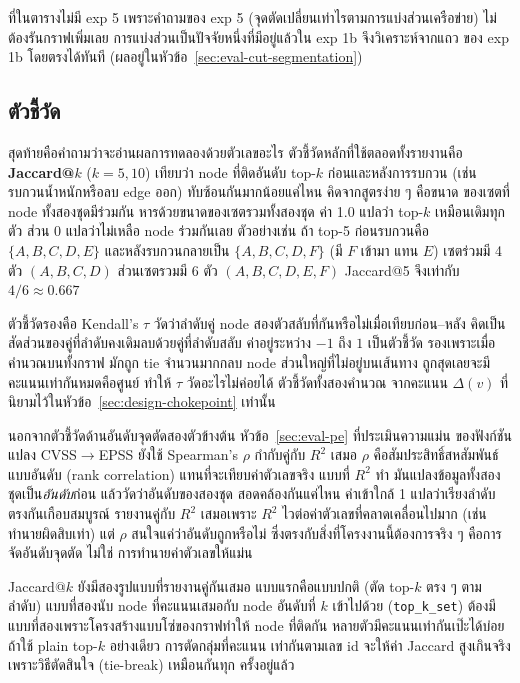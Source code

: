 ที่ในตารางไม่มี exp 5 เพราะคำถามของ exp 5 (จุดตัดเปลี่ยนเท่าไรตามการแบ่งส่วนเครือข่าย)
ไม่ต้องรันกราฟเพิ่มเลย การแบ่งส่วนเป็นปัจจัยหนึ่งที่มีอยู่แล้วใน exp 1b จึงวิเคราะห์จากแถว
ของ exp 1b โดยตรงได้ทันที (ผลอยู่ในหัวข้อ~\ref{sec:eval-cut-segmentation})

\subsection{ตัวชี้วัด}\label{sec:design-metrics}

สุดท้ายคือคำถามว่าจะอ่านผลการทดลองด้วยตัวเลขอะไร ตัวชี้วัดหลักที่ใช้ตลอดทั้งรายงานคือ
\textbf{Jaccard@$k$} ($k=5,10$) เทียบว่า node ที่ติดอันดับ top-$k$ ก่อนและหลังการรบกวน
(เช่น รบกวนน้ำหนักหรือลบ edge ออก) ทับซ้อนกันมากน้อยแค่ไหน คิดจากสูตรง่าย ๆ คือขนาด
ของเซตที่ node ทั้งสองชุดมีร่วมกัน หารด้วยขนาดของเซตรวมทั้งสองชุด ค่า 1.0 แปลว่า
top-$k$ เหมือนเดิมทุกตัว ส่วน 0 แปลว่าไม่เหลือ node ร่วมกันเลย ตัวอย่างเช่น ถ้า top-5
ก่อนรบกวนคือ $\{A,B,C,D,E\}$ และหลังรบกวนกลายเป็น $\{A,B,C,D,F\}$ (มี $F$ เข้ามา
แทน $E$) เซตร่วมมี 4 ตัว $(A,B,C,D)$ ส่วนเซตรวมมี 6 ตัว $(A,B,C,D,E,F)$ Jaccard@5
จึงเท่ากับ $4/6 \approx 0.667$

ตัวชี้วัดรองคือ Kendall's $\tau$ วัดว่าลำดับคู่ node สองตัวสลับที่กันหรือไม่เมื่อเทียบก่อน--หลัง
คิดเป็นสัดส่วนของคู่ที่ลำดับคงเดิมลบด้วยคู่ที่ลำดับสลับ ค่าอยู่ระหว่าง $-1$ ถึง $1$ เป็นตัวชี้วัด
รองเพราะเมื่อคำนวณบนทั้งกราฟ มักถูก tie จำนวนมากกลบ node ส่วนใหญ่ที่ไม่อยู่บนเส้นทาง
ถูกสุดเลยจะมีคะแนนเท่ากันหมดคือศูนย์ ทำให้ $\tau$ วัดอะไรไม่ค่อยได้ ตัวชี้วัดทั้งสองคำนวณ
จากคะแนน $\Delta(v)$ ที่นิยามไว้ในหัวข้อ~\ref{sec:design-chokepoint} เท่านั้น

นอกจากตัวชี้วัดด้านอันดับจุดตัดสองตัวข้างต้น หัวข้อ~\ref{sec:eval-pe} ที่ประเมินความแม่น
ของฟังก์ชันแปลง CVSS$\to$EPSS ยังใช้ Spearman's $\rho$ กำกับคู่กับ $R^2$ เสมอ
$\rho$ คือสัมประสิทธิ์สหสัมพันธ์แบบอันดับ (rank correlation) แทนที่จะเทียบค่าตัวเลขจริง
แบบที่ $R^2$ ทำ มันแปลงข้อมูลทั้งสองชุดเป็น\emph{อันดับ}ก่อน แล้ววัดว่าอันดับของสองชุด
สอดคล้องกันแค่ไหน ค่าเข้าใกล้ 1 แปลว่าเรียงลำดับตรงกันเกือบสมบูรณ์ รายงานคู่กับ $R^2$
เสมอเพราะ $R^2$ ไวต่อค่าตัวเลขที่คลาดเคลื่อนไปมาก (เช่นทำนายผิดสิบเท่า) แต่ $\rho$
สนใจแค่ว่าอันดับถูกหรือไม่ ซึ่งตรงกับสิ่งที่โครงงานนี้ต้องการจริง ๆ คือการจัดอันดับจุดตัด ไม่ใช่
การทำนายค่าตัวเลขให้แม่น

Jaccard@$k$ ยังมีสองรูปแบบที่รายงานคู่กันเสมอ แบบแรกคือแบบปกติ (ตัด top-$k$ ตรง ๆ
ตามลำดับ) แบบที่สองนับ node ที่คะแนนเสมอกับ node อันดับที่ $k$ เข้าไปด้วย
(\texttt{top\_k\_set}) ต้องมีแบบที่สองเพราะโครงสร้างแบบโซ่ของกราฟทำให้ node ที่ติดกัน
หลายตัวมีคะแนนเท่ากันเป๊ะได้บ่อย ถ้าใช้ plain top-$k$ อย่างเดียว การตัดกลุ่มที่คะแนน
เท่ากันตามเลข id จะให้ค่า Jaccard สูงเกินจริง เพราะวิธีตัดสินใจ (tie-break) เหมือนกันทุก
ครั้งอยู่แล้ว

